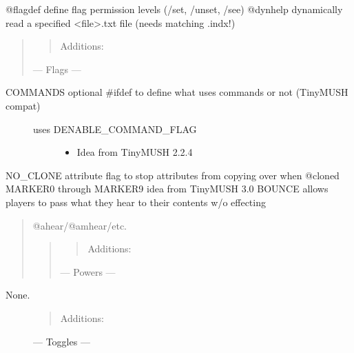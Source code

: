 \documentclass[letterpaper,10pt,english]{sphinxmanual}
\begin{document}
\sphinxAtStartPar
@flagdef \sphinxhyphen{} define flag permission levels (/set, /unset, /see)
@dynhelp \sphinxhyphen{} dynamically read a specified \textless{}file\textgreater{}.txt file (needs matching .indx!)
\begin{quote}
\begin{quote}

\sphinxAtStartPar
Additions:
\end{quote}

\sphinxAtStartPar
— Flags —
\end{quote}
\begin{description}
\item[{COMMANDS \sphinxhyphen{} optional \#ifdef to define what uses commands or not (TinyMUSH compat)}] \leavevmode\begin{description}
\item[{uses \sphinxhyphen{}DENABLE\_COMMAND\_FLAG}] \leavevmode\begin{itemize}
\item {} 
\sphinxAtStartPar
Idea from TinyMUSH 2.2.4

\end{itemize}

\end{description}

\end{description}

\sphinxAtStartPar
NO\_CLONE \sphinxhyphen{} attribute flag to stop attributes from copying over when @cloned
MARKER0 through MARKER9         \sphinxhyphen{} idea from TinyMUSH 3.0
BOUNCE \sphinxhyphen{} allows players to pass what they hear to their contents w/o effecting
\begin{quote}

\sphinxAtStartPar
@ahear/@amhear/etc.
\begin{quote}
\begin{quote}

\sphinxAtStartPar
Additions:
\end{quote}

\sphinxAtStartPar
— Powers —
\end{quote}
\end{quote}
\begin{description}
\item[{None.}] \leavevmode\begin{quote}

\sphinxAtStartPar
Additions:
\end{quote}

\sphinxAtStartPar
— Toggles —

\end{description}
\end{document}
